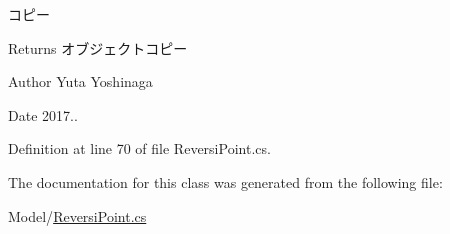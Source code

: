 コピー 

\begin{DoxyReturn}{Returns}
オブジェクトコピー 
\end{DoxyReturn}
\begin{DoxyAuthor}{Author}
Yuta Yoshinaga 
\end{DoxyAuthor}
\begin{DoxyDate}{Date}
2017.. 
\end{DoxyDate}


Definition at line 70 of file Reversi\+Point.\+cs.



The documentation for this class was generated from the following file\+:\begin{DoxyCompactItemize}
\item 
Model/\hyperlink{_reversi_point_8cs}{Reversi\+Point.\+cs}\end{DoxyCompactItemize}
